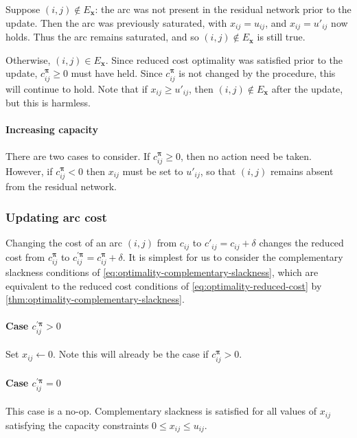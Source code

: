 Suppose $(i,j) \not \in E_\mathbf{x}$: the arc was not present in the residual network prior to the update. Then the arc was previously saturated, with $x_{ij} = u_{ij}$, and $x_{ij} = u'_{ij}$ now holds. Thus the arc remains saturated, and so $(i,j) \not \in E_\mathbf{x}$ is still true.

Otherwise, $(i,j) \in E_\mathbf{x}$. Since reduced cost optimality was satisfied prior to the update, $c_{ij}^{\boldsymbol{\pi}} \geq 0$ must have held. Since $c_{ij}^{\boldsymbol{\pi}}$ is not changed by the procedure, this will continue to hold. Note that if $x_{ij} \geq u'_{ij}$, then $(i,j) \not \in E_\mathbf{x}$ after the update, but this is harmless.

\paragraph{Increasing capacity} 
There are two cases to consider. If $c_{ij}^{\boldsymbol{\pi}} \geq 0$, then no action need be taken. However, if $c_{ij}^{\boldsymbol{\pi}} < 0$ then $x_{ij}$ must be set to $u'_{ij}$, so that $(i,j)$ remains absent from the residual network.

\subsubsection{Updating arc cost}

Changing the cost of an arc $(i,j)$ from $c_{ij}$ to $c'_{ij} = c_{ij} + \delta$ changes the reduced cost from $c_{ij}^{\boldsymbol{\pi}}$ to $c_{ij}^{\prime\boldsymbol{\pi}} = c_{ij}^{\boldsymbol{\pi}} + \delta$. It is simplest for us to consider the complementary slackness conditions of \cref{eq:optimality-complementary-slackness}, which are equivalent to the reduced cost conditions of \cref{eq:optimality-reduced-cost} by \cref{thm:optimality-complementary-slackness}.

\paragraph{Case $c_{ij}^{\prime\boldsymbol{\pi}} > 0$}
Set $x_{ij} \gets 0$. Note this will already be the case if $c_{ij}^{\boldsymbol{\pi}} > 0$.

\paragraph{Case $c_{ij}^{\prime\boldsymbol{\pi}} = 0$}
This case is a no-op. Complementary slackness is satisfied for all values of $x_{ij}$ satisfying the capacity constraints $0 \leq x_{ij} \leq u_{ij}$.

